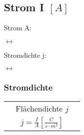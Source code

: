 \subsection{Strom I \hfill $[A]$}
    Strom A:

    \vspace{-1mm}\begin{minipage}{0.4\linewidth}
        \begin{footnotesize}
            \begin{center}
                
            \end{center}
        \end{footnotesize}
    \end{minipage}
    $\longleftrightarrow$
    \begin{minipage}{0.4\linewidth}
        \begin{footnotesize}
            \begin{center}
            \end{center}
        \end{footnotesize}
    \end{minipage}
    \vspace{1mm}

    Stromdichte j:

    \vspace{-1mm}\begin{minipage}{0.25\linewidth}
        \begin{footnotesize}
            \begin{center}
                
            \end{center}
        \end{footnotesize}
    \end{minipage}
    $\longleftrightarrow$
    \begin{minipage}{0.55\linewidth}
        \begin{footnotesize}
            \begin{center}
            \end{center}
        \end{footnotesize}
    \end{minipage}
    \vspace{1mm}

    \subsubsection{Stromdichte}
        \begin{tabular}{c c c}
            & Flächendichte $j$ &\\
            & $j = \frac{I}{A} \left[\frac{C}{s \cdot m^2}\right]$ &
        \end{tabular}

